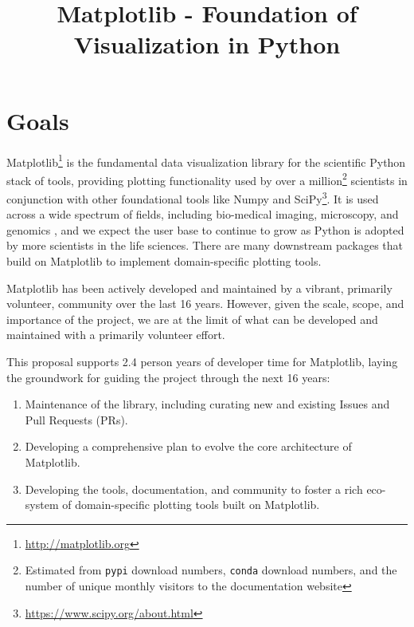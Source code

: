 \documentclass[11pt]{article}  %
\begin{document}
\title{Matplotlib - Foundation of Visualization in Python}
\author{}
\maketitle

\section{Goals}

Matplotlib\footnote{\url{http://matplotlib.org}} is the fundamental
data visualization library for the scientific Python stack of tools,
providing plotting functionality used by over a
million\footnote{Estimated from \texttt{pypi} download numbers,
\texttt{conda} download numbers, and the number of unique monthly
visitors to the documentation website} scientists in conjunction with
other foundational tools like Numpy and
SciPy\footnote{\url{https://www.scipy.org/about.html}}.  It is used
across a wide spectrum of fields, including bio-medical imaging,
microscopy, and genomics
\cite{Carpenter2006,Wolf2018,10.7717/peerj.453,
  Segata2011,10.1371/journal.pgen.1000695,HASHIMSHONY2012666,
  10.1093/bioinformatics/bts480,Carlile2014,Laganowsky2014,Jiangaac9462,
  10.3389/fninf.2014.00014}, and we expect the user base to continue
to grow as Python is adopted by more scientists in the life
sciences. There are many downstream packages that build on Matplotlib
to implement domain-specific plotting tools.

Matplotlib has been actively developed and maintained by a vibrant,
primarily volunteer, community over the last 16 years.  However, given
the scale, scope, and importance of the project, we are at the limit
of what can be developed and maintained with a primarily volunteer
effort.

This proposal supports 2.4 person years of developer time for
Matplotlib, laying the groundwork for guiding
the project through the next 16 years:

\begin{enumerate}[label=\alph*),noitemsep]
  \item Maintenance of the library, including curating new and
    existing Issues and Pull Requests (PRs).
  \item Developing a comprehensive plan to evolve the core architecture
    of Matplotlib.
  \item Developing the tools, documentation, and community to foster a
    rich eco-system of domain-specific plotting tools built on
    Matplotlib.
\end{enumerate}
\end{document}
